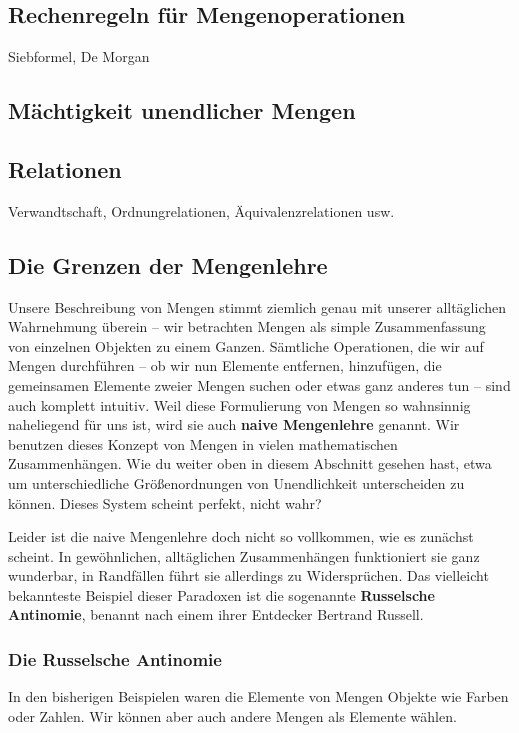 \documentclass[../../main.tex]{subfiles}
\begin{document}
\subsection*{Rechenregeln für Mengenoperationen}
Siebformel, De Morgan

\subsection*{Mächtigkeit unendlicher Mengen}


\subsection*{Relationen}
\label{relationen}
Verwandtschaft, Ordnungrelationen, Äquivalenzrelationen usw.

\subsection*{Die Grenzen der Mengenlehre}
Unsere Beschreibung von Mengen stimmt ziemlich genau mit unserer alltäglichen Wahrnehmung überein -- wir betrachten Mengen als simple Zusammenfassung von einzelnen Objekten zu einem Ganzen. Sämtliche Operationen, die wir auf Mengen durchführen -- ob wir nun Elemente entfernen, hinzufügen, die gemeinsamen Elemente zweier Mengen suchen oder etwas ganz anderes tun -- sind auch komplett intuitiv. Weil diese Formulierung von Mengen so wahnsinnig naheliegend für uns ist, wird sie auch \textbf{naive Mengenlehre} genannt. Wir benutzen dieses Konzept von Mengen in vielen mathematischen Zusammenhängen. Wie du weiter oben in diesem Abschnitt gesehen hast, etwa um unterschiedliche Größenordnungen von Unendlichkeit unterscheiden zu können. Dieses System scheint perfekt, nicht wahr?

Leider ist die naive Mengenlehre doch nicht so vollkommen, wie es zunächst scheint. In gewöhnlichen, alltäglichen Zusammenhängen funktioniert sie ganz wunderbar, in Randfällen führt sie allerdings zu Widersprüchen. Das vielleicht bekannteste Beispiel dieser Paradoxen ist die sogenannte \textbf{Russelsche Antinomie}, benannt nach einem ihrer Entdecker Bertrand Russell. 

\subsubsection{Die Russelsche Antinomie}
In den bisherigen Beispielen waren die Elemente von Mengen Objekte wie Farben oder Zahlen. Wir können aber auch andere Mengen als Elemente wählen. 
\end{document}
